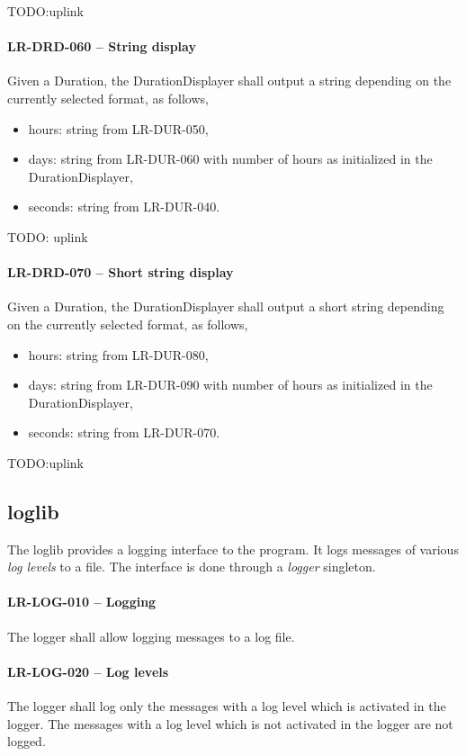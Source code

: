 TODO:uplink
\paragraph{LR-DRD-060 -- String display}
Given a Duration, the DurationDisplayer shall output a string depending
on the currently selected format, as follows,
\begin{itemize}
\item hours: string from LR-DUR-050,
\item days: string from LR-DUR-060 with number of hours as initialized in the
            DurationDisplayer,
\item seconds: string from LR-DUR-040.
\end{itemize}

TODO: uplink
\paragraph{LR-DRD-070 -- Short string display}
Given a Duration, the DurationDisplayer shall output a short string depending
on the currently selected format, as follows,
\begin{itemize}
\item hours: string from LR-DUR-080,
\item days: string from LR-DUR-090 with number of hours as initialized in the
            DurationDisplayer,
\item seconds: string from LR-DUR-070.
\end{itemize}

TODO:uplink
\subsection{log\textunderscore lib}
The log\textunderscore lib provides a logging interface to the program.
It logs messages of various \emph{log levels} to a file. The interface
is done through a \emph{logger} singleton.

\paragraph{LR-LOG-010 -- Logging}
The logger shall allow logging messages to a log file.

\paragraph{LR-LOG-020 -- Log levels}
The logger shall log only the messages with a log level which is
activated in the logger. The messages with a log level which is
not activated in the logger are not logged.

